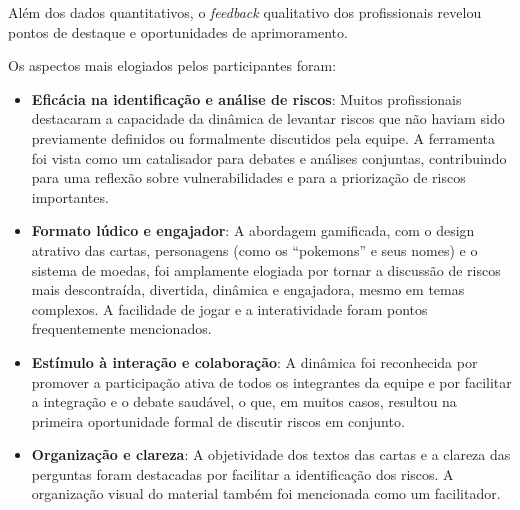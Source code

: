 \documentclass[
	12pt,
	openright,
	twoside,
	a4paper,
	english,
	brazil
	]{abntex2}
\begin{document}
Além dos dados quantitativos, o \textit{feedback} qualitativo dos profissionais revelou pontos de destaque e oportunidades de aprimoramento.

Os aspectos mais elogiados pelos participantes foram:
\begin{itemize}
  \item \textbf{Eficácia na identificação e análise de riscos}: Muitos profissionais destacaram a capacidade da dinâmica de levantar riscos que não haviam sido previamente definidos ou formalmente discutidos pela equipe. A ferramenta foi vista como um catalisador para debates e análises conjuntas, contribuindo para uma reflexão sobre vulnerabilidades e para a priorização de riscos importantes.
  \item \textbf{Formato lúdico e engajador}: A abordagem gamificada, com o design atrativo das cartas, personagens (como os  “pokemons” e seus nomes) e o sistema de moedas, foi amplamente elogiada por tornar a discussão de riscos mais descontraída, divertida, dinâmica e engajadora, mesmo em temas complexos. A facilidade de jogar e a interatividade foram pontos frequentemente mencionados.
  \item \textbf{Estímulo à interação e colaboração}: A dinâmica foi reconhecida por promover a participação ativa de todos os integrantes da equipe e por facilitar a integração e o debate saudável, o que, em muitos casos, resultou na primeira oportunidade formal de discutir riscos em conjunto.
  \item \textbf{Organização e clareza}: A objetividade dos textos das cartas e a clareza das perguntas foram destacadas por facilitar a identificação dos riscos. A organização visual do material também foi mencionada como um facilitador.
\end{itemize}
\end{document}
